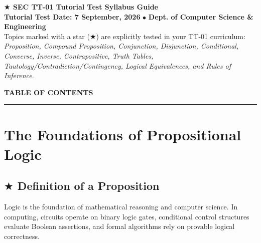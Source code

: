 \documentclass[11pt,a4paper]{article}
\begin{document}
\newpage
\begin{tcolorbox}[
    enhanced,
    colback=lightteal,
    colframe=teal,
    boxrule=0.8pt,
    arc=3pt,
    left=8pt, right=8pt, top=5pt, bottom=5pt
]
\textbf{\color{navy}\normalsize $\bigstar$ SEC TT-01 Tutorial Test Syllabus Guide}\\[2pt]
{\footnotesize\textbf{\color{teal}Tutorial Test Date: 7 September, 2026} $\bullet$ \textbf{Dept. of Computer Science \& Engineering}}\\[2pt]
{\footnotesize Topics marked with a star (\textbf{\color{gold!90!black}$\bigstar$}) are explicitly tested in your TT-01 curriculum: \textit{Proposition, Compound Proposition, Conjunction, Disjunction, Conditional, Converse, Inverse, Contrapositive, Truth Tables, Tautology/Contradiction/Contingency, Logical Equivalences, and Rules of Inference}.}
\end{tcolorbox}
\vspace{6pt}

\begin{center}
{\color{navy}\bfseries\large\MakeUppercase{Table of Contents}}\\[-4pt]
{\color{gold}\rule{\linewidth}{1pt}}
\end{center}
\vspace{2pt}

\begingroup
\hypersetup{linkcolor=navy}
\setcounter{tocdepth}{2}
\makeatletter
{}
\makeatother
\endgroup

\newpage

\section{The Foundations of Propositional Logic}

\subsection{\texorpdfstring{$\bigstar$ }{*}Definition of a Proposition}
Logic is the foundation of mathematical reasoning and computer science. In computing, circuits operate on binary logic gates, conditional control structures evaluate Boolean assertions, and formal algorithms rely on provable logical correctness.
\end{document}
